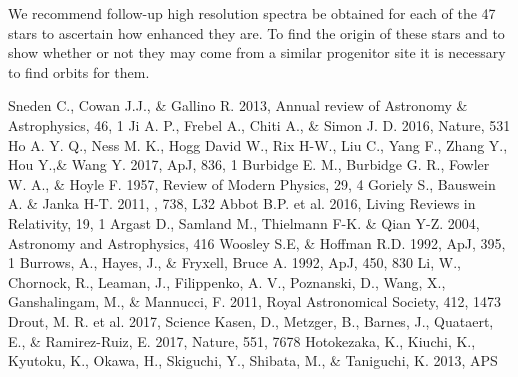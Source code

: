 \documentclass[a4paper,fleqn,usenatbib]{mnras}
\begin{document}
	We recommend follow-up high resolution spectra be obtained for each of the 47 stars to ascertain how enhanced they are. To find the origin of these stars and to show whether or not they may come from a similar progenitor site it is necessary to find orbits for them.
	
	
	
	
	\begin{thebibliography}{99}
		Sneden C., Cowan J.J., \& Gallino R. 2013, Annual review of Astronomy \& Astrophysics, 46, 1
		Ji A. P., Frebel A., Chiti A., \& Simon J. D. 2016, Nature, 531
		Ho A. Y. Q., Ness M. K., Hogg David W., Rix H-W., Liu C., Yang F., Zhang Y., Hou Y.,\& Wang Y. 2017, ApJ, 836, 1
		Burbidge E. M., Burbidge G. R., Fowler W. A., \& Hoyle F. 1957, Review of Modern Physics, 29, 4
		Goriely S., Bauswein A. \& Janka H-T. 2011, , 738, L32
		Abbot B.P. et al. 2016, Living Reviews in Relativity, 19, 1
		Argast D., Samland M., Thielmann F-K. \& Qian Y-Z. 2004, Astronomy and Astrophysics, 416
		Woosley S.E, \& Hoffman R.D. 1992, ApJ, 395, 1
		Burrows, A., Hayes, J., \& Fryxell, Bruce A. 1992, ApJ, 450, 830
		Li, W., Chornock, R., Leaman, J., Filippenko, A. V., Poznanski, D., Wang, X., Ganshalingam, M., \& Mannucci, F. 2011, Royal Astronomical Society, 412, 1473
		Drout, M. R. et al. 2017, Science
		Kasen, D., Metzger, B., Barnes, J., Quataert, E., \& Ramirez-Ruiz, E. 2017, Nature, 551, 7678
		Hotokezaka, K., Kiuchi, K., Kyutoku, K., Okawa, H., Skiguchi, Y., Shibata, M., \& Taniguchi, K. 2013, APS
	\end{thebibliography}
	
\end{document}

